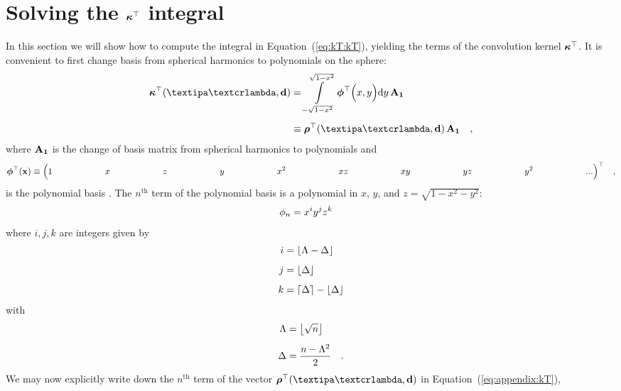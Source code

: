 \documentclass[modern]{aastex631}
\begin{document}
%
%
%
%
\clearpage
\appendix
%
%
%
%

\section{Solving the $\kT$ integral}
%
In this section we will show how to compute the integral in Equation~(\ref{eq:kT:kT}), yielding the terms of the convolution kernel $\kT$. 
It is convenient to first change basis from spherical harmonics to polynomials on the sphere:
%
\begin{align}
    \label{eq:appendix:kT}
    \kT(\lnlam, \Dargs)
     & =
    \int\limits_{-\sqrt{1 - x^2}}^
    {\sqrt{1 - x^2}}
    \pbasis
    \Big(x, y\Big)
    \mathrm{d}y
    \,
    \AOne
    \nonumber \\[0.5em]
     & \equiv
    \rhoT(\lnlam, \Dargs)
    \,
    \AOne
    \quad,
\end{align}
%
where $\AOne$ is the change of basis matrix from spherical harmonics to polynomials \citep[Equation B11 in][]{Luger2019} and
%
\begin{align}
    \pbasis(\x) \equiv
    \Big(
    1 \quad\quad\quad\quad\quad\quad x \quad\quad\quad\quad\quad\quad z \quad\quad\quad\quad\quad\quad y \quad\quad\quad\quad\quad\quad x^2 \quad\quad\quad\quad\quad\quad xz \quad\quad\quad\quad\quad\quad xy \quad\quad\quad\quad\quad\quad yz \quad\quad\quad\quad\quad\quad y^2 \quad\quad\quad\quad\quad\quad
    ...
    \Big)^\top
    \quad,
\end{align}
%
is the polynomial basis \citep[Equation 7][]{Luger2019}.
The $n^\mathrm{th}$ term of the polynomial basis is a polynomial in $x$, $y$, and $z = \sqrt{1 - x^2 - y^2}$:
%
\begin{align}
    \pbasisn
    &=
    x^i y^j z^k
\end{align}
%
where $i, j, k$ are integers given by
%
\begin{align}
    \label{eq:kT:lm}
    i &= \floor*{\Lambda - \Delta}
    \nonumber \\[0.5em]
    j &= \floor*{\Delta}
    \nonumber \\[0.5em]
    k &= \ceil*{\Delta} - \floor*{\Delta}
\end{align}
%
with
%
\begin{align}
    \Lambda &= \floor*{\sqrt{n}}
    \nonumber \\[0.5em]
    \Delta &= \frac{n - \Lambda^2}{2}
    \quad .
\end{align}
%
We may now explicitly write down the $n^\mathrm{th}$ term of the vector $\rhoT(\lnlam, \Dargs)$ in Equation~(\ref{eq:appendix:kT}),
\end{document}
